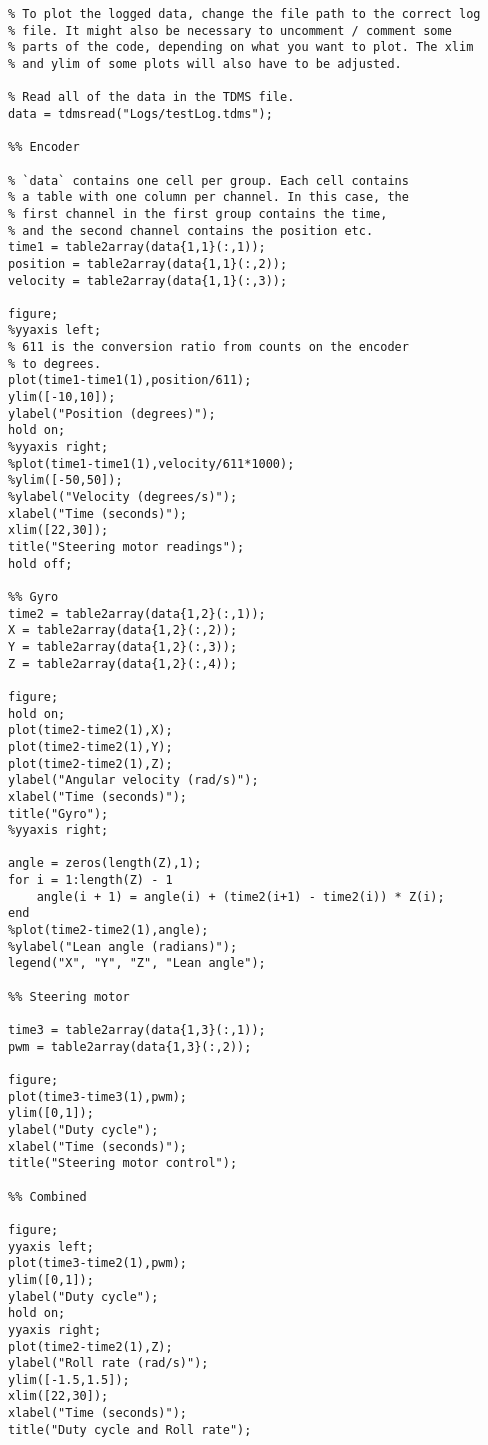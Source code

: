 \begin{lstlisting}
% To plot the logged data, change the file path to the correct log
% file. It might also be necessary to uncomment / comment some
% parts of the code, depending on what you want to plot. The xlim
% and ylim of some plots will also have to be adjusted.

% Read all of the data in the TDMS file.
data = tdmsread("Logs/testLog.tdms");

%% Encoder

% `data` contains one cell per group. Each cell contains
% a table with one column per channel. In this case, the
% first channel in the first group contains the time, 
% and the second channel contains the position etc.
time1 = table2array(data{1,1}(:,1));
position = table2array(data{1,1}(:,2));
velocity = table2array(data{1,1}(:,3));

figure;
%yyaxis left;
% 611 is the conversion ratio from counts on the encoder
% to degrees.
plot(time1-time1(1),position/611);
ylim([-10,10]);
ylabel("Position (degrees)");
hold on;
%yyaxis right;
%plot(time1-time1(1),velocity/611*1000);
%ylim([-50,50]);
%ylabel("Velocity (degrees/s)");
xlabel("Time (seconds)");
xlim([22,30]);
title("Steering motor readings");
hold off;

%% Gyro
time2 = table2array(data{1,2}(:,1));
X = table2array(data{1,2}(:,2));
Y = table2array(data{1,2}(:,3));
Z = table2array(data{1,2}(:,4));

figure;
hold on;
plot(time2-time2(1),X);
plot(time2-time2(1),Y);
plot(time2-time2(1),Z);
ylabel("Angular velocity (rad/s)");
xlabel("Time (seconds)");
title("Gyro");
%yyaxis right;

angle = zeros(length(Z),1);
for i = 1:length(Z) - 1
    angle(i + 1) = angle(i) + (time2(i+1) - time2(i)) * Z(i);
end
%plot(time2-time2(1),angle);
%ylabel("Lean angle (radians)");
legend("X", "Y", "Z", "Lean angle");

%% Steering motor

time3 = table2array(data{1,3}(:,1));
pwm = table2array(data{1,3}(:,2));

figure;
plot(time3-time3(1),pwm);
ylim([0,1]);
ylabel("Duty cycle");
xlabel("Time (seconds)");
title("Steering motor control");

%% Combined

figure;
yyaxis left;
plot(time3-time2(1),pwm);
ylim([0,1]);
ylabel("Duty cycle");
hold on;
yyaxis right;
plot(time2-time2(1),Z);
ylabel("Roll rate (rad/s)");
ylim([-1.5,1.5]);
xlim([22,30]);
xlabel("Time (seconds)");
title("Duty cycle and Roll rate");


\end{lstlisting}
